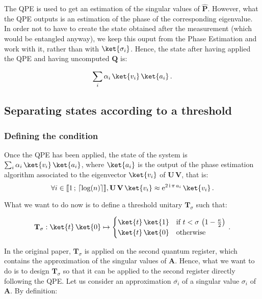 \documentclass[11pt, a4paper]{article}
\begin{document}
            The QPE is used to get an estimation of the singular values of \(\hat{\mathbf{P}}\). However, what the QPE outputs is an estimation of the phase of the corresponding eigenvalue. In order not to have to create the state  obtained after the measurement (which would be entangled anyway), we keep this ouput from the Phase Estimation and work with it, rather than with \(\ket{\sigma_i}\). Hence, the state after having applied the QPE and having uncomputed \(\mathbf{Q}\) is:
            
            \[\sum_i\alpha_i\,\ket{v_i}\,\ket{a_i}\,.\]
        \subsection{Separating states according to a threshold}
            \label{subsec:Threshold}
            \subsubsection{Defining the condition}
                Once the QPE has been applied, the state of the system is \(\sum_i\alpha_i\,\ket{v_i}\,\ket{a_i}\), where \(\ket{a_i}\) is the output of the phase estimation algorithm associated to the eigenvector \(\ket{v_i}\) of \(\mathbf{U}\,\mathbf{V}\), that is:
                \[\forall i\in\llbracket1\,;\,\lceil\log(n)\rceil\rrbracket,\mathbf{U}\,\mathbf{V}\,\ket{v_i}\approx\mathrm{e}^{2\,\mathrm{i}\,\pi\,a_i}\,\ket{v_i}\,.\]
                
                What we want to do now is to define a threshold unitary \(\mathbf{T}_\sigma\) such that:
                
                \[\mathbf{T}_\sigma:\ket{t}\,\ket{0}\mapsto\begin{cases}\ket{t}\,\ket{1} &\text{if } t < \sigma\,\left(1-\frac\kappa2\right)\\\ket{t}\,\ket{0}&\text{otherwise}\end{cases}\,.\]
                
                In the original paper, \(\mathbf{T}_\sigma\) is applied on the second quantum register, which contains the approximation of the singular values of \(\mathbf{A}\). Hence, what we want to do is to design \(\mathbf{T}_\sigma\) so that it can be applied to the second register directly following the QPE. Let us consider an approximation \(\overline{\sigma_i}\) of a singular value \(\sigma_i\) of \(\mathbf{A}\). By definition:
                
\end{document}
